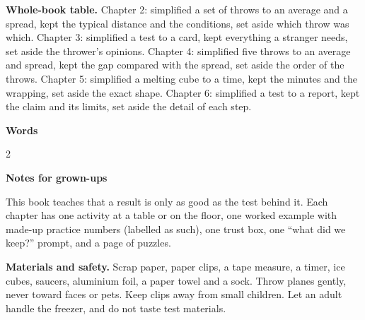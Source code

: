 \textbf{Whole-book table.} Chapter 2: simplified a set of throws to an average and a spread, kept the typical distance and the conditions, set aside which throw was which. Chapter 3: simplified a test to a card, kept everything a stranger needs, set aside the thrower's opinions. Chapter 4: simplified five throws to an average and spread, kept the gap compared with the spread, set aside the order of the throws. Chapter 5: simplified a melting cube to a time, kept the minutes and the wrapping, set aside the exact shape. Chapter 6: simplified a test to a report, kept the claim and its limits, set aside the detail of each step.

\clearpage\label{notes}
{\sans\bfseries\LARGE\color{ink} Words}\par
\small
\begin{multicols}{2}
\end{multicols}

\vspace{0.4em}
{\sans\bfseries\large\color{sky!70!black} Notes for grown-ups}\par
This book teaches that a result is only as good as the test behind it. Each chapter has one activity at a table or on the floor, one worked example with made-up practice numbers (labelled as such), one trust box, one ``what did we keep?'' prompt, and a page of puzzles.

\textbf{Materials and safety.} Scrap paper, paper clips, a tape measure, a timer, ice cubes, saucers, aluminium foil, a paper towel and a sock. Throw planes gently, never toward faces or pets. Keep clips away from small children. Let an adult handle the freezer, and do not taste test materials.

